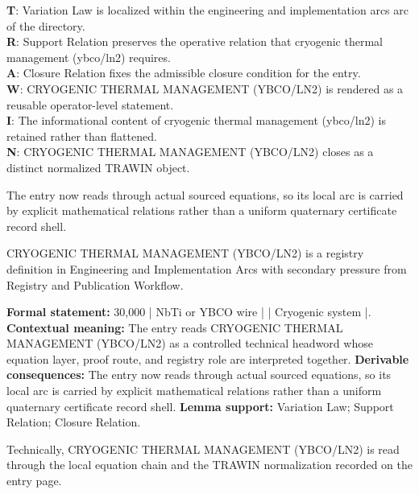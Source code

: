 \begin{minipage}[t]{0.48\linewidth}
\small
\textbf{T}: Variation Law is localized within the engineering and implementation arcs arc of the directory.\\
\textbf{R}: Support Relation preserves the operative relation that cryogenic thermal management (ybco/ln2) requires.\\
\textbf{A}: Closure Relation fixes the admissible closure condition for the entry.\\
\textbf{W}: CRYOGENIC THERMAL MANAGEMENT (YBCO/LN2) is rendered as a reusable operator-level statement.\\
\textbf{I}: The informational content of cryogenic thermal management (ybco/ln2) is retained rather than flattened.\\
\textbf{N}: CRYOGENIC THERMAL MANAGEMENT (YBCO/LN2) closes as a distinct normalized TRAWIN object.
\normalsize
\end{minipage}

The entry now reads through actual sourced equations, so its local arc is carried by explicit mathematical relations rather than a uniform quaternary certificate record shell.
\clearpage


\begingroup\small
{}
CRYOGENIC THERMAL MANAGEMENT (YBCO/LN2) is a registry definition in Engineering and Implementation Arcs with secondary pressure from Registry and Publication Workflow.

\begingroup\footnotesize\setlength{\emergencystretch}{3em}\sloppy
\textbf{Formal statement:} 30,000 | NbTi or YBCO wire | | Cryogenic system |. \textbf{Contextual meaning:} The entry reads CRYOGENIC THERMAL MANAGEMENT (YBCO/LN2) as a controlled technical headword whose equation layer, proof route, and registry role are interpreted together. \textbf{Derivable consequences:} The entry now reads through actual sourced equations, so its local arc is carried by explicit mathematical relations rather than a uniform quaternary certificate record shell. \textbf{Lemma support:} Variation Law; Support Relation; Closure Relation.\par
\endgroup

Technically, CRYOGENIC THERMAL MANAGEMENT (YBCO/LN2) is read through the local equation chain and the TRAWIN normalization recorded on the entry page.


